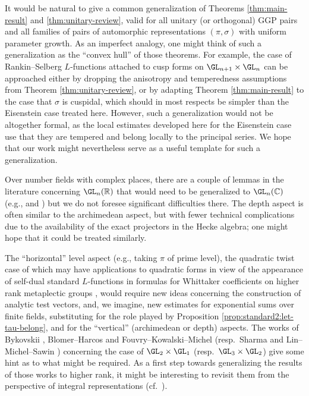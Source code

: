 It would be natural to give a common generalization of Theorems \ref{thm:main-result} and \ref{thm:unitary-review}, valid for all unitary (or orthogonal) GGP pairs and all families of pairs of automorphic representations $(\pi,\sigma)$ with uniform parameter growth.  As an imperfect analogy, one might think of such a generalization as the ``convex hull'' of those theorems.  For example, the case of Rankin--Selberg $L$-functions attached to cusp forms on $\GL_{n+1} \times \GL_n$ can be approached either by dropping the anisotropy and temperedness assumptions from Theorem \ref{thm:unitary-review}, or by adapting Theorem \ref{thm:main-result} to the case that $\sigma$ is cuspidal, which should in most respects be simpler than the Eisenstein case treated here.  However, such a generalization would not be altogether formal, as the local estimates developed here for the Eisenstein case use that they are tempered and belong locally to the principal series.  We hope that our work might nevertheless serve as a useful template for such a generalization.

Over number fields with complex places, there are a couple of lemmas in the literature concerning $\GL_n(\mathbb{R})$ that would need to be generalized to $\GL_n(\mathbb{C})$ (e.g., \cite[Lemma 3]{MR2733072} and \cite[Lemma 5.2]{JN19a}) but we do not foresee significant difficulties there.  The depth aspect is often similar to the archimedean aspect, but with fewer technical complications due to the availability of the exact projectors in the Hecke algebra; one might hope that it could be treated similarly.

The ``horizontal'' level aspect (e.g., taking $\pi$ of prime level), the quadratic twist case of which may have applications to quadratic forms in view of the appearance of self-dual standard $L$-functions in formulas for Whittaker coefficients on higher rank metaplectic groups \cite{MR3267120, MR3619910, MR3649366}, would require new ideas concerning the construction of analytic test vectors, and, we imagine, new estimates for exponential sums over finite fields, substituting for the role played by Proposition \ref{prop:standard2:let-tau-belong}, \cite[Thm 4.2 (iii) and Thm 15.1]{2020arXiv201202187N} and \cite[\S16--17]{2020arXiv201202187N} for the ``vertical'' (archimedean or depth) aspects.  The works of Bykovskii \cite{MR1433344}, Blomer--Harcos \cite{MR2431250, MR3259045} and Fouvry--Kowalski--Michel \cite{MR3334236} (resp.\ Sharma \cite{2019arXiv190609493S} and Lin--Michel--Sawin \cite{2019arXiv191209473L}) concerning the case of $\GL_2 \times \GL_1$ (resp.\ $\GL_3 \times \GL_2$) give some hint as to what might be required.  As a first step towards generalizing the results of those works to higher rank, it might be interesting to revisit them from the perspective of integral representations (cf.\ \cite{2020arXiv200201993N, MR4206609, 2020arXiv200406791S}).

